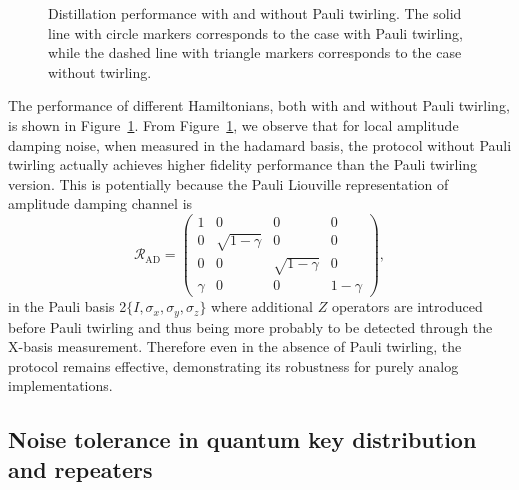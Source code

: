 \documentclass[onecolumn,prx,longbibliography,nofootinbib, superscriptaddress]{revtex4-2}
\theoremstyle{recap}
\begin{document}
\begin{figure}[htbp]
    \centering
    
    \caption{Distillation performance with and without Pauli twirling. The solid line with circle markers corresponds to the case with Pauli twirling, while the dashed line with triangle markers corresponds to the case without twirling.}
    \label{fig:Pauli_Twirling}
\end{figure}

The performance of different Hamiltonians, both with and without Pauli twirling, is shown in Figure~\ref{fig:Pauli_Twirling}. From Figure~\ref{fig:Pauli_Twirling}, we observe that for local amplitude damping noise, when measured in the hadamard basis, the protocol without Pauli twirling actually achieves higher fidelity performance than the Pauli twirling version. This is potentially because the Pauli Liouville representation of amplitude damping channel is 
\begin{equation}
    \mathcal{R}_{\text{AD}} = \begin{pmatrix}
        1 & 0 & 0 & 0 \\
        0 & \sqrt{1-\gamma} & 0 & 0 \\
        0 & 0 & \sqrt{1-\gamma} & 0 \\
        \gamma & 0 & 0 & 1-\gamma
    \end{pmatrix},
\end{equation}
in the Pauli basis 2$\{I, \sigma_x, \sigma_y, \sigma_z\}$ where additional $Z$ operators are introduced before Pauli twirling and thus being more probably to be detected through the X-basis measurement. Therefore even in the absence of Pauli twirling, the protocol remains effective, demonstrating its robustness for purely analog implementations.

\subsection{Noise tolerance in quantum key distribution and repeaters}
\end{document}
